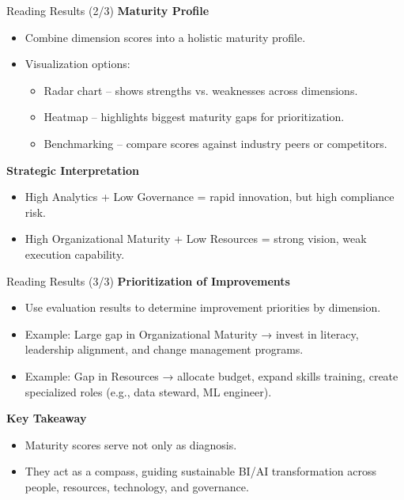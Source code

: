 \documentclass[aspectratio=169, table]{beamer}
\begin{document}
\begin{frame}{Reading Results (2/3)}
	\vspace{20pt}
	\textbf{Maturity Profile}
	\begin{itemize}
		\item Combine dimension scores into a holistic maturity profile.  
		\item Visualization options:  
		\begin{itemize}
			\item Radar chart – shows strengths vs. weaknesses across dimensions.  
			\item Heatmap – highlights biggest maturity gaps for prioritization.  
			\item Benchmarking – compare scores against industry peers or competitors.  
		\end{itemize}
	\end{itemize}
	
	\textbf{Strategic Interpretation}
	\begin{itemize}
		\item High Analytics + Low Governance = rapid innovation, but high compliance risk.  
		\item High Organizational Maturity + Low Resources = strong vision, weak execution capability.  
	\end{itemize}
\end{frame}

\begin{frame}{Reading Results (3/3)}
	\vspace{20pt}
	\textbf{Prioritization of Improvements}
	\begin{itemize}
		\item Use evaluation results to determine improvement priorities by dimension.  
		\item Example: Large gap in Organizational Maturity → invest in literacy, leadership alignment, and change management programs.  
		\item Example: Gap in Resources → allocate budget, expand skills training, create specialized roles (e.g., data steward, ML engineer).  
	\end{itemize}
	
	\textbf{Key Takeaway}
	\begin{itemize}
		\item Maturity scores serve not only as diagnosis.  
		\item They act as a compass, guiding sustainable BI/AI transformation across people, resources, technology, and governance.  
	\end{itemize}
\end{frame}
\end{document}
